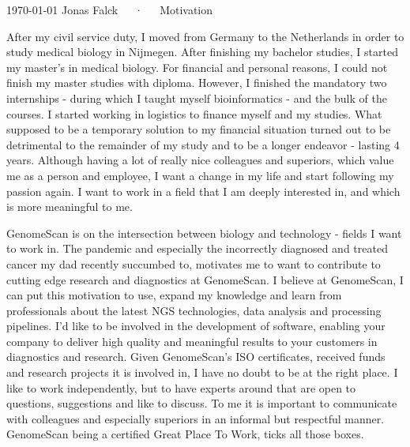 \documentclass[11pt, a4paper]{awesome-cv}
\begin{document}
\makecvheader[R]

\makecvfooter
  {\today}
  {Jonas Falck~~~·~~~Motivation}
  {}

\makelettertitle

\begin{cvletter}

After my civil service duty, I moved from Germany to the Netherlands in order to study medical biology in Nijmegen. 
After finishing my bachelor studies, I started my master's in medical biology.
For financial and personal reasons, I could not finish my master studies with diploma.
However, I finished the mandatory two internships - during which I taught myself bioinformatics - and the bulk of the courses.
I started working in logistics to finance myself and my studies.
What supposed to be a temporary solution to my financial situation turned out to be detrimental to the remainder of my study and to be a longer endeavor - lasting 4 years.
Although having a lot of really nice colleagues and superiors, which value me as a person and employee, I want a change in my life and start following my passion again.
I want to work in a field that I am deeply interested in, and which is more meaningful to me.

GenomeScan is on the intersection between biology and technology - fields I want to work in.
The pandemic and especially the incorrectly diagnosed and treated cancer my dad recently succumbed to, motivates me to want to contribute to cutting edge research and diagnostics at GenomeScan.
I believe at GenomeScan, I can put this motivation to use, expand my knowledge and learn from professionals about the latest NGS technologies, data analysis and processing pipelines.
I'd like to be involved in the development of software, enabling your company to deliver high quality and meaningful results to your customers in diagnostics and research.
Given GenomeScan's ISO certificates, received funds and research projects it is involved in, I have no doubt to be at the right place.
I like to work independently, but to have experts around that are open to questions, suggestions and like to discuss.
To me it is important to communicate with colleagues and especially superiors in an informal but respectful manner.
GenomeScan being a certified Great Place To Work, ticks all those boxes.


\end{cvletter}
\end{document}
